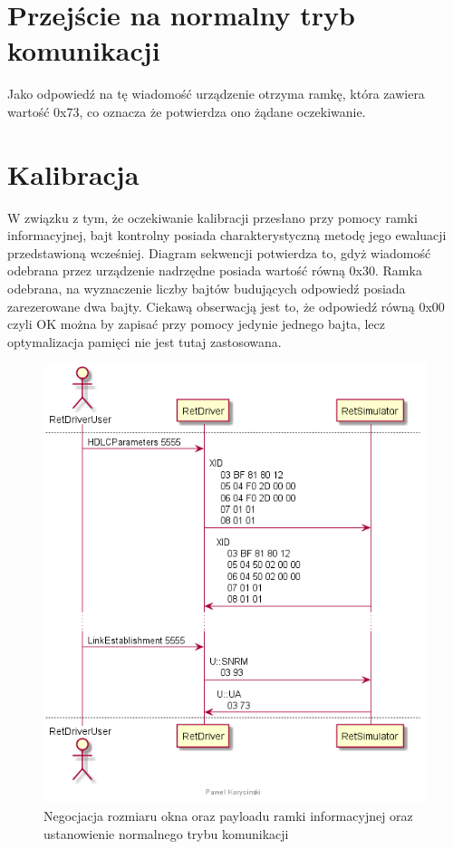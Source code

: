     \section{Przejście na normalny tryb komunikacji}
    Jako odpowiedź na tę wiadomość urządzenie otrzyma ramkę, która zawiera wartość 0x73, co oznacza że 
    potwierdza ono żądane oczekiwanie.

    \section{Kalibracja}
    W związku z tym, że oczekiwanie kalibracji przesłano przy pomocy ramki informacyjnej, bajt kontrolny posiada
    charakterystyczną metodę jego ewaluacji przedstawioną wcześniej. Diagram sekwencji
    potwierdza to, gdyż wiadomość odebrana przez urządzenie nadrzędne posiada wartość równą 0x30.
    Ramka odebrana, na wyznaczenie liczby bajtów budujących odpowiedź posiada zarezerowane dwa bajty. 
    Ciekawą obserwacją jest to, że odpowiedź równą 0x00 czyli OK można by zapisać przy pomocy jedynie jednego bajta, lecz optymalizacja
    pamięci nie jest tutaj zastosowana.

    \begin{figure}[h!]
    \centering
    \includegraphics[scale=0.75]{out/Diagramy/UML_DiagramOfSequence_New/KalibracjaRETa-page3.png}
    \caption{Negocjacja rozmiaru okna oraz payloadu ramki informacyjnej oraz ustanowienie normalnego trybu komunikacji}
    \end{figure}

